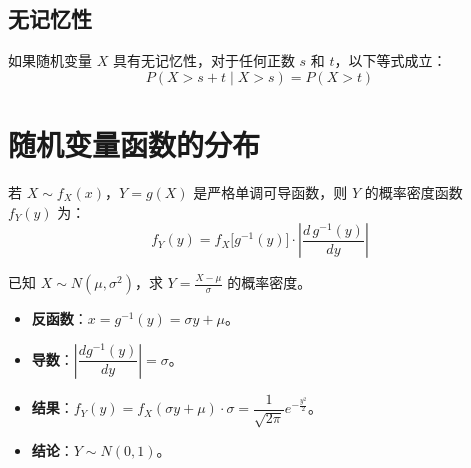 \subsection{无记忆性}
\begin{definition}[无记忆性]
如果随机变量 $X$ 具有无记忆性，对于任何正数 $s$ 和 $t$，以下等式成立：
\begin{equation}
	P(X > s + t \mid X > s) = P(X > t)
	\label{eq:第二章:无记忆性}
\end{equation}
\end{definition}

\section{随机变量函数的分布}
\begin{theorem}
若 $X \sim f_X(x)$，$Y = g(X)$ 是严格单调可导函数，则 $Y$ 的概率密度函数 $f_Y(y)$ 为：
\begin{equation}
	f_Y(y) = f_X\big[g^{-1}(y)\big] \cdot \left|\frac{d\,g^{-1}(y)}{d y}\right|
	\label{eq:第二章:公式法}
\end{equation}
\end{theorem}

\begin{example}[线性变换]
已知 $X \sim N(\mu, \sigma^{2})$，求 $Y = \frac{X-\mu}{\sigma}$ 的概率密度。
\begin{itemize}
	\item \textbf{反函数}：$x = g^{-1}(y) = \sigma y + \mu$。
	\item \textbf{导数}：$\left|\dfrac{d g^{-1}(y)}{d y}\right| = \sigma$。
	\item \textbf{结果}：$f_Y(y) = f_X(\sigma y + \mu) \cdot \sigma = \dfrac{1}{\sqrt{2\pi}} e^{-\frac{y^{2}}{2}}$。
	\item \textbf{结论}：$Y \sim N(0, 1)$。
\end{itemize}
\end{example}
